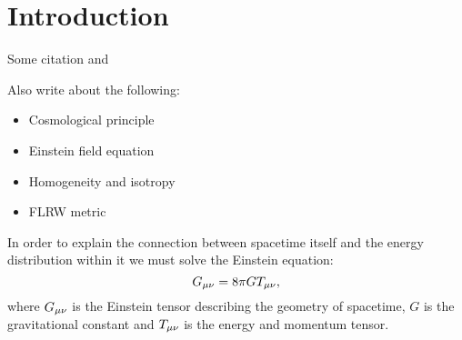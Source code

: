 \section{Introduction}\label{sec:introduction}

Some citation \cite{dodelson2020modern} and \cite{weinberg2008cosmology}

Also write about the following:

\begin{itemize}
    \item Cosmological principle
    \item Einstein field equation
    \item Homogeneity and isotropy
    \item FLRW metric 
\end{itemize}

In order to explain the connection between spacetime itself and the energy distribution within it we must solve the Einstein equation:
\begin{equation}\label{eq:introduction:einstein_equation}
    G_{\mu\nu} = 8\pi GT_{\mu\nu},
\end{equation}
where $G_{\mu\nu}$ is the Einstein tensor describing the geometry of spacetime, $G$ is the gravitational constant and $T_{\mu\nu}$ is the energy and momentum tensor.


